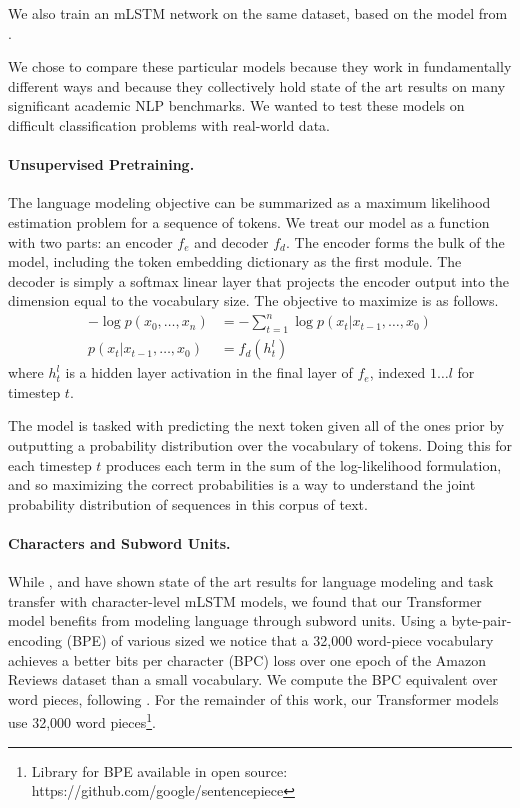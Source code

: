 \documentclass[letterpaper]{article} %
\begin{document}
We also train an mLSTM network on the same dataset, based on the model from \protect\cite{Puri2018}.

We chose to compare these particular models because they work in fundamentally different ways and because they collectively hold state of the art results on many significant academic NLP benchmarks. We wanted to test these models on difficult classification problems with real-world data.


\paragraph{Unsupervised Pretraining.}
The language modeling objective can be summarized as a maximum likelihood estimation problem for a sequence of tokens. We treat our model as a function with two parts: an encoder $f_e$ and decoder $f_d$. The encoder forms the bulk of the model, including the token embedding dictionary as the first module. The decoder is simply a softmax linear layer that projects the encoder output into the dimension equal to the vocabulary size. The objective to maximize is as follows.
\begin{align*}
-\log{p(x_0,\ldots, x_n)} &= -\sum_{t=1}^n \log{p(x_t | x_{t-1}, \ldots, x_0)} \\
p(x_t | x_{t-1}, \ldots, x_0) &= f_d(h^l_t)
\end{align*}
where $h^l_t$ is a hidden layer activation in the final layer of $f_e$, indexed $1 \ldots l$ for timestep $t$.

The model is tasked with predicting the next token given all of the ones prior by outputting a probability distribution over the vocabulary of tokens. Doing this for each timestep $t$ produces each term in the sum of the log-likelihood formulation, and so maximizing the correct probabilities is a way to understand the joint probability distribution of sequences in this corpus of text.



\paragraph{Characters and Subword Units.}
While \protect\cite{Radford2017}, \protect\cite{Gray2017} and \cite{Puri2018} have shown state of the art results for language modeling and task transfer with character-level mLSTM models, we found that our Transformer model benefits from modeling language through subword units. Using a byte-pair-encoding (BPE) \protect\cite{BPE2015} of various sized %
we notice that a 32,000 word-piece vocabulary achieves a better bits per character (BPC) loss over one epoch of the Amazon Reviews dataset \protect\cite{McAuley2015} than a small vocabulary. We compute the BPC equivalent over word pieces, following \protect\cite{SubwordMikolov2012}.
For the remainder of this work, our Transformer models use 32,000 word pieces\footnote{Library for BPE available in open source: https://github.com/google/sentencepiece}.
\end{document}

